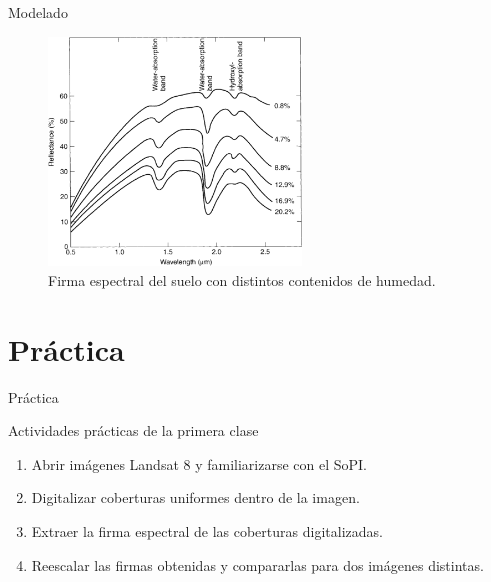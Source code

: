 \documentclass[handout]{beamer}
\begin{document}
\begin{frame}{Modelado}
    \begin{figure}
    \centering
    \includegraphics[width=0.6\textwidth]{imagenes/soilvar.png}
    \caption{Firma espectral del suelo con distintos contenidos de humedad.}
    \end{figure}
\end{frame}

\section{Pr\'actica}

\begin{frame}{Pr\'actica}
  \begin{exampleblock}{Actividades pr\'acticas de la primera clase}
    \begin{enumerate}
      \item Abrir im\'agenes Landsat 8 y familiarizarse con el SoPI.
      \item Digitalizar coberturas uniformes dentro de la imagen.
      \item Extraer la firma espectral de las coberturas digitalizadas.
      \item Reescalar las firmas obtenidas y compararlas para dos im\'agenes distintas.
    \end{enumerate}
  \end{exampleblock}
\end{frame}
\end{document}
